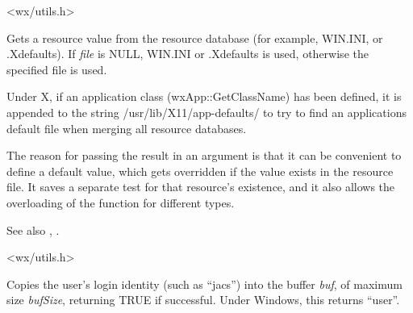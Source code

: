 


<wx/utils.h>

\label{wxgetresource}





Gets a resource value from the resource database (for example, WIN.INI, or
.Xdefaults). If {\it file} is NULL, WIN.INI or .Xdefaults is used,
otherwise the specified file is used.

Under X, if an application class (wxApp::GetClassName) has been defined,
it is appended to the string /usr/lib/X11/app-defaults/ to try to find
an applications default file when merging all resource databases.

The reason for passing the result in an argument is that it
can be convenient to define a default value, which gets overridden
if the value exists in the resource file. It saves a separate
test for that resource's existence, and it also allows
the overloading of the function for different types.

See also , .


<wx/utils.h>



Copies the user's login identity (such as ``jacs'') into the buffer {\it
buf}, of maximum size {\it bufSize}, returning TRUE if successful.
Under Windows, this returns ``user''.

